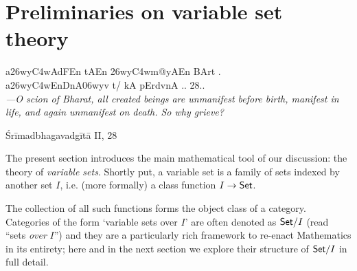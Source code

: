 \section{Preliminaries on variable set theory}\label{sec_prelim}
\epigraph
{{\dn  a\326wy\3C4wAdFEn tAEn \326wy\3C4wm@yAEn BArt . \\
			a\326wy\3C4wEnDnA\306wy\?v t/ kA pErd\?vnA .. 28..} \\[2mm]
			\footnotesize\emph{---O scion of Bharat, all created beings are unmanifest before birth, manifest in life, and again unmanifest on death. So why grieve?}}
{Śrīmadbhagavadgītā II, 28}
The present section introduces the main mathematical tool of our discussion: the theory of \emph{variable sets}. Shortly put, a variable set is a family of sets indexed by another set $I$, i.e. (more formally) a class function $I \to \mathsf{Set}$.

The collection of all such functions forms the object class of a category. Categories of the form `variable sets over $I$' are often denoted as $\mathsf{Set}/I$ (read ``sets \emph{over} $I$'') and they are a particularly rich framework to re-enact Mathematics in its entirety; here and in the next section we explore their structure of $\mathsf{Set}/I$ in full detail.

